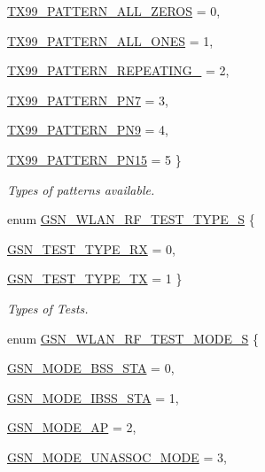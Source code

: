\begin{DoxyCompactItemize}
\hyperlink{a00640_gga651010efc8cff4e360fd72c7d32a70a9a7b0f6c4fc037430360bb1a515fbd2261}{TX99\_\-PATTERN\_\-ALL\_\-ZEROS} =  0, 
\par
\hyperlink{a00640_gga651010efc8cff4e360fd72c7d32a70a9ac5997221faab077928ba36901f9ac13d}{TX99\_\-PATTERN\_\-ALL\_\-ONES} =  1, 
\par
\hyperlink{a00640_gga651010efc8cff4e360fd72c7d32a70a9ab3b8555f274736bb950108d0bd3c598b}{TX99\_\-PATTERN\_\-REPEATING\_} =  2, 
\par
\hyperlink{a00640_gga651010efc8cff4e360fd72c7d32a70a9ae96c1a78fb24fcbe775fefda62757452}{TX99\_\-PATTERN\_\-PN7} =  3, 
\par
\hyperlink{a00640_gga651010efc8cff4e360fd72c7d32a70a9a55c749918a1b75ad9ab5091c250e8c0e}{TX99\_\-PATTERN\_\-PN9} =  4, 
\par
\hyperlink{a00640_gga651010efc8cff4e360fd72c7d32a70a9a46eb7d7ab33b8cc68e2a3cf127375470}{TX99\_\-PATTERN\_\-PN15} =  5
 \}
\begin{DoxyCompactList}\small\item\em Types of patterns available. \end{DoxyCompactList}\item 
enum \hyperlink{a00677_ga3c5fd791827dffd656e69ad09ce2304e}{GSN\_\-WLAN\_\-RF\_\-TEST\_\-TYPE\_\-S} \{ \par
\hyperlink{a00640_gga3c5fd791827dffd656e69ad09ce2304eaca614bc30bd8954133ec65e0d1476b2d}{GSN\_\-TEST\_\-TYPE\_\-RX} =  0, 
\par
\hyperlink{a00640_gga3c5fd791827dffd656e69ad09ce2304eac474ecc66322eaff905fd8428af8f25f}{GSN\_\-TEST\_\-TYPE\_\-TX} =  1
 \}
\begin{DoxyCompactList}\small\item\em Types of Tests. \end{DoxyCompactList}\item 
enum \hyperlink{a00677_ga8d2c2dc6c9f7927c5cf4634d7b403b95}{GSN\_\-WLAN\_\-RF\_\-TEST\_\-MODE\_\-S} \{ \par
\hyperlink{a00640_gga8d2c2dc6c9f7927c5cf4634d7b403b95a7b846af0882a2e9fdd177f290b02a6a1}{GSN\_\-MODE\_\-BSS\_\-STA} =  0, 
\par
\hyperlink{a00640_gga8d2c2dc6c9f7927c5cf4634d7b403b95ada8c3c5dcc25a633515f39d0622ed38a}{GSN\_\-MODE\_\-IBSS\_\-STA} =  1, 
\par
\hyperlink{a00640_gga8d2c2dc6c9f7927c5cf4634d7b403b95a67277979d811dae8f619f13ae651e957}{GSN\_\-MODE\_\-AP} =  2, 
\par
\hyperlink{a00640_gga8d2c2dc6c9f7927c5cf4634d7b403b95a2b9ddf1d3ec73ebec39439826d471cce}{GSN\_\-MODE\_\-UNASSOC\_\-MODE} =  3, 

\end{DoxyCompactItemize}
